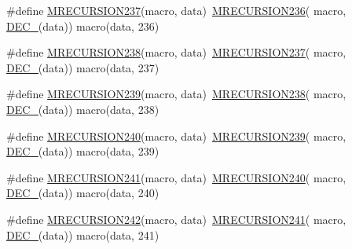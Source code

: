 \begin{DoxyCompactItemize}
\item 
\#define \mbox{\hyperlink{group__group__sam0__utils__mrecursion_gab9258aa3f5d03304ea107256779c5f8d}{M\+R\+E\+C\+U\+R\+S\+I\+O\+N237}}(macro,  data)~\mbox{\hyperlink{group__group__sam0__utils__mrecursion_gac42f885ee78a99d9b0ea05eee47744f7}{M\+R\+E\+C\+U\+R\+S\+I\+O\+N236}}(  macro, \mbox{\hyperlink{group__group__sam0__utils__mrecursion_ga1d23d683797679dca8c3512a54a5dcae}{D\+E\+C\+\_\+}}(data))   macro(data, 236)
\item 
\#define \mbox{\hyperlink{group__group__sam0__utils__mrecursion_gaded5f696adc611ccbf8aa9a4b8841a24}{M\+R\+E\+C\+U\+R\+S\+I\+O\+N238}}(macro,  data)~\mbox{\hyperlink{group__group__sam0__utils__mrecursion_gab9258aa3f5d03304ea107256779c5f8d}{M\+R\+E\+C\+U\+R\+S\+I\+O\+N237}}(  macro, \mbox{\hyperlink{group__group__sam0__utils__mrecursion_ga1d23d683797679dca8c3512a54a5dcae}{D\+E\+C\+\_\+}}(data))   macro(data, 237)
\item 
\#define \mbox{\hyperlink{group__group__sam0__utils__mrecursion_ga6ab69c1fbf584a9c78f9ab0929850a32}{M\+R\+E\+C\+U\+R\+S\+I\+O\+N239}}(macro,  data)~\mbox{\hyperlink{group__group__sam0__utils__mrecursion_gaded5f696adc611ccbf8aa9a4b8841a24}{M\+R\+E\+C\+U\+R\+S\+I\+O\+N238}}(  macro, \mbox{\hyperlink{group__group__sam0__utils__mrecursion_ga1d23d683797679dca8c3512a54a5dcae}{D\+E\+C\+\_\+}}(data))   macro(data, 238)
\item 
\#define \mbox{\hyperlink{group__group__sam0__utils__mrecursion_ga9923ea8aad0a2c13e0685441357f2e96}{M\+R\+E\+C\+U\+R\+S\+I\+O\+N240}}(macro,  data)~\mbox{\hyperlink{group__group__sam0__utils__mrecursion_ga6ab69c1fbf584a9c78f9ab0929850a32}{M\+R\+E\+C\+U\+R\+S\+I\+O\+N239}}(  macro, \mbox{\hyperlink{group__group__sam0__utils__mrecursion_ga1d23d683797679dca8c3512a54a5dcae}{D\+E\+C\+\_\+}}(data))   macro(data, 239)
\item 
\#define \mbox{\hyperlink{group__group__sam0__utils__mrecursion_ga0a5cf75038514f2ec97ba39d8bee8e7a}{M\+R\+E\+C\+U\+R\+S\+I\+O\+N241}}(macro,  data)~\mbox{\hyperlink{group__group__sam0__utils__mrecursion_ga9923ea8aad0a2c13e0685441357f2e96}{M\+R\+E\+C\+U\+R\+S\+I\+O\+N240}}(  macro, \mbox{\hyperlink{group__group__sam0__utils__mrecursion_ga1d23d683797679dca8c3512a54a5dcae}{D\+E\+C\+\_\+}}(data))   macro(data, 240)
\item 
\#define \mbox{\hyperlink{group__group__sam0__utils__mrecursion_gac9925d3d1732bd7e47e61f7c9dfeafbd}{M\+R\+E\+C\+U\+R\+S\+I\+O\+N242}}(macro,  data)~\mbox{\hyperlink{group__group__sam0__utils__mrecursion_ga0a5cf75038514f2ec97ba39d8bee8e7a}{M\+R\+E\+C\+U\+R\+S\+I\+O\+N241}}(  macro, \mbox{\hyperlink{group__group__sam0__utils__mrecursion_ga1d23d683797679dca8c3512a54a5dcae}{D\+E\+C\+\_\+}}(data))   macro(data, 241)

\end{DoxyCompactItemize}
